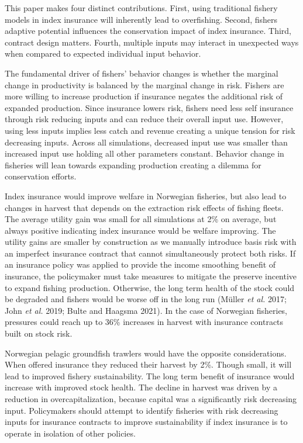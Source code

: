 \documentclass[
  letterpaper,
  DIV=11,
  numbers=noendperiod]{scrartcl}
\theoremstyle{plain}
\theoremstyle{plain}
\theoremstyle{remark}
\begin{document}
This paper makes four distinct contributions. First, using traditional
fishery models in index insurance will inherently lead to overfishing.
Second, fishers adaptive potential influences the conservation impact of
index insurance. Third, contract design matters. Fourth, multiple inputs
may interact in unexpected ways when compared to expected individual
input behavior.

The fundamental driver of fishers' behavior changes is whether the
marginal change in productivity is balanced by the marginal change in
risk. Fishers are more willing to increase production if insurance
negates the additional risk of expanded production. Since insurance
lowers risk, fishers need less self insurance through risk reducing
inputs and can reduce their overall input use. However, using less
inputs implies less catch and revenue creating a unique tension for risk
decreasing inputs. Across all simulations, decreased input use was
smaller than increased input use holding all other parameters constant.
Behavior change in fisheries will lean towards expanding production
creating a dilemma for conservation efforts.

Index insurance would improve welfare in Norwegian fisheries, but also
lead to changes in harvest that depends on the extraction risk effects
of fishing fleets. The average utility gain was small for all
simulations at 2\% on average, but always positive indicating index
insurance would be welfare improving. The utility gains are smaller by
construction as we manually introduce basis risk with an imperfect
insurance contract that cannot simultaneously protect both risks. If an
insurance policy was applied to provide the income smoothing benefit of
insurance, the policymaker must take measures to mitigate the preserve
incentive to expand fishing production. Otherwise, the long term health
of the stock could be degraded and fishers would be worse off in the
long run (Müller \emph{et al.} 2017; John \emph{et al.} 2019; Bulte and
Haagsma 2021). In the case of Norwegian fisheries, pressures could reach
up to 36\% increases in harvest with insurance contracts built on stock
risk.

Norwegian pelagic groundfish trawlers would have the opposite
considerations. When offered insurance they reduced their harvest by
2\%. Though small, it will lead to improved fishery sustainability. The
long term benefit of insurance would increase with improved stock
health. The decline in harvest was driven by a reduction in
overcapitalization, because capital was a significantly risk decreasing
input. Policymakers should attempt to identify fisheries with risk
decreasing inputs for insurance contracts to improve sustainability if
index insurance is to operate in isolation of other policies.
\end{document}

